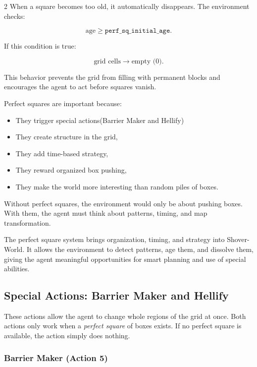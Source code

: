 \documentclass[a4paper]{article}
\begin{document}
\begin{multicols}{2}
When a square becomes too old, it automatically disappears.  
The environment checks:

\[
\text{age} \ge \texttt{perf\_sq\_initial\_age}.
\]

If this condition is true:

\[
\text{grid cells} \longrightarrow \text{empty (0)}.
\]

This behavior prevents the grid from filling with permanent blocks and encourages the agent to act before squares vanish.

Perfect squares are important because:

\begin{itemize}[label=*]
    \item They trigger special actions(Barrier Maker and Hellify)

    \item They create structure in the grid,
    \item They add time-based strategy,
    \item They reward organized box pushing,
    \item They make the world more interesting than random piles of boxes.
\end{itemize}

Without perfect squares, the environment would only be about pushing boxes. With them, the agent must think about patterns, timing, and map transformation.


The perfect square system brings organization, timing, and strategy into Shover-World. It allows the environment to detect patterns, age them, and dissolve them, giving the agent meaningful opportunities for smart planning and use of special abilities.






\subsection{Special Actions: Barrier Maker and Hellify}

These actions allow the agent to change whole regions of the grid at once. Both actions only work when a \emph{perfect square} of boxes exists. If no perfect square is available, the action simply does nothing.


\subsubsection{Barrier Maker (Action 5)}


\end{multicols}
\end{document}
